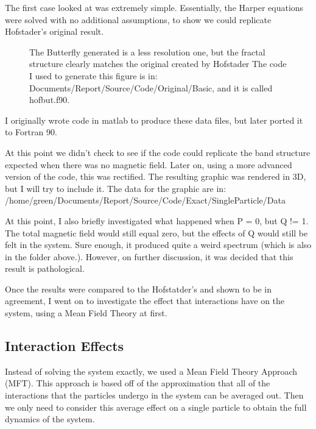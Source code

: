 \documentclass[12pt]{article}
\begin{document}
The first case looked at was extremely simple. Essentially, the Harper equations were solved with no
additional assumptions, to show we could replicate Hofstader's original result.
\begin{figure}[H]
	\centerline{}
	\caption{ The Butterfly generated is a less resolution one, but the fractal structure
	  clearly matches the original created by Hofstader
          The code I used to generate this figure is in:
          Documents/Report/Source/Code/Original/Basic, and it is called
          hofbut.f90.
        }
	\label{Figure 1}
\end{figure}
I originally wrote code in matlab to produce these data files, but later ported it to
Fortran 90.

At this point we didn't check to see if the code could
replicate the band structure expected when there was no magnetic field.
Later on, using a more advanced version of the code, this was rectified.
The resulting graphic was rendered in 3D, but I will try to include it.
The data for the graphic are in:
\\
/home/green/Documents/Report/Source/Code/Exact/SingleParticle/Data

At this point, I also briefly investigated what happened when P = 0, but Q != 1.
The total magnetic field would still equal zero, but the effects of Q would still
be felt in the system.
Sure enough, it produced quite a weird spectrum (which is also in the folder above.).
However, on further discussion, it was decided that this result is pathological.


Once the results were compared to the Hofstatder's and shown to be in agreement,
I went on to investigate the effect that interactions have on the system, using a Mean
Field Theory at first.



\subsection{Interaction Effects}
Instead of solving the system exactly, we used a Mean Field Theory Approach (MFT).
This approach is based off of the approximation that all of the interactions
that the particles undergo in the system can be averaged out. Then we only
need to consider this average effect on a single particle to obtain
the full dynamics of the system.
\end{document}
